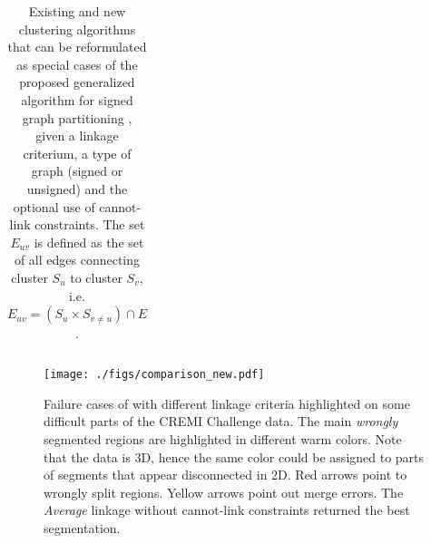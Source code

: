 \begin{table}[t]
\begin{subtable}[t!]{\textwidth}
\begin{tabular}{c | c  c  c  c  c}
             


             







            
        \end{tabular}
    \end{subtable} 
    \caption{Existing and new clustering algorithms that can be reformulated as special cases of the proposed generalized algorithm for signed graph partitioning \algname{}, given a linkage criterium, a type of graph (signed or unsigned) and the optional use of cannot-link constraints. The set $E_{uv}$ is defined as the set of all edges connecting cluster $S_u$ to cluster $S_v$, i.e. $E_{uv}=(S_u \times S_{v \neq u}) \cap E$.}
    \label{tab:linkage-criteria}
\end{table}

\begin{figure}
\centering
\texttt{[image: ./figs/comparison\_new.pdf]} %
\caption{Failure cases of \algname{} with different linkage criteria highlighted on some difficult parts of the CREMI Challenge data. The main \emph{wrongly} segmented regions are highlighted in different warm colors. Note that the data is 3D, hence the same color could be assigned to parts of segments that appear disconnected in 2D.  Red arrows point to wrongly split regions. Yellow arrows point out merge errors. The \emph{Average} linkage without cannot-link constraints returned the best segmentation.
\label{fig:cremi_comparison}}
\end{figure}
